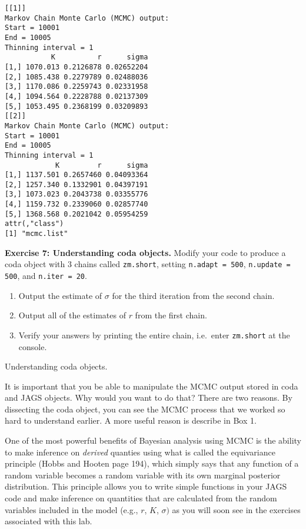 \documentclass[12pt,english]{article}
\begin{document}
{\begin{Verbatim}[fontsize=\small]
[[1]]
Markov Chain Monte Carlo (MCMC) output:
Start = 10001
End = 10005
Thinning interval = 1
           K          r      sigma
[1,] 1070.013 0.2126878 0.02652204
[2,] 1085.438 0.2279789 0.02488036
[3,] 1170.086 0.2259743 0.02331958
[4,] 1094.564 0.2228788 0.02137309
[5,] 1053.495 0.2368199 0.03209893
[[2]]
Markov Chain Monte Carlo (MCMC) output:
Start = 10001
End = 10005
Thinning interval = 1
            K         r      sigma
[1,] 1137.501 0.2657460 0.04093364
[2,] 1257.340 0.1332901 0.04397191
[3,] 1073.023 0.2043738 0.03355776
[4,] 1159.732 0.2339060 0.02857740
[5,] 1368.568 0.2021042 0.05954259
attr(,"class")
[1] "mcmc.list"
\end{Verbatim}

\belowcaptionskip=-20pt
\begin{exercise}
\begin{mdframed}
\doublespacing
\textbf{Exercise 7: Understanding coda objects.} Modify your code to produce a coda object with 3 chains called \texttt{zm.short}, setting \texttt{n.adapt = 500}, \texttt{n.update = 500}, and \texttt{n.iter = 20}.
\begin{enumerate}
\item Output the estimate of $\sigma$ for the third iteration from the second chain.
\item Output all of the estimates of $r$ from the first chain.
\item Verify your answers by printing the entire chain, i.e.\ enter \texttt{zm.short} at the console.
\end{enumerate}
\end{mdframed}
\captionsetup{textformat=empty, labelformat=empty}
\caption[Understanding coda objects]{Understanding coda objects.}
\label{ex:coda understanding}
\end{exercise}
\belowcaptionskip=0pt

It is important that you be able to manipulate the MCMC output stored in coda and JAGS objects. Why would you want to do that? There are two reasons. By dissecting the coda object, you can see the MCMC process that we worked so hard to understand earlier. A more useful reason is describe in Box 1.

\begin{mdframed}[frametitle={Box 1: Using R to calculate derived quantities from MCMC objects}, backgroundcolor=black!10]
One of the most powerful benefits of Bayesian analysis using MCMC is the ability to make inference on \emph{derived} quanties using what is called the equivariance principle (Hobbs and Hooten \citeyearpar{hobbs2015bayesian} page 194), which simply says that any function of a random variable becomes a random variable with its own marginal posterior distribution. This principle allows you to write simple functions in your JAGS code and make inference on quantities that are calculated from the random variables included in the model (e.g., $r$, $K$, $\sigma)$ as you will soon see in the exercises associated with this lab. 


\end{mdframed}}
\end{document}
